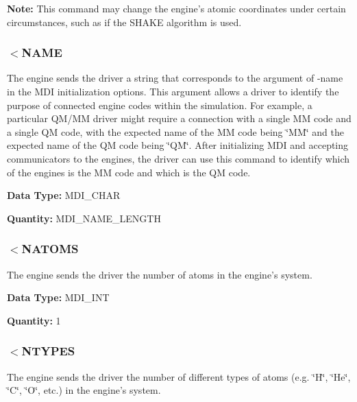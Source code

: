 \begin{DoxyParagraph}{}
{\bfseries  Note\-: } This command may change the engine's atomic coordinates under certain circumstances, such as if the S\-H\-A\-K\-E algorithm is used.
\end{DoxyParagraph}
\hypertarget{index_send_name}{}\subsubsection{$<$\-N\-A\-M\-E}\label{index_send_name}
The engine sends the driver a string that corresponds to the argument of {\ttfamily -\/name} in the M\-D\-I initialization options. This argument allows a driver to identify the purpose of connected engine codes within the simulation. For example, a particular Q\-M/\-M\-M driver might require a connection with a single M\-M code and a single Q\-M code, with the expected name of the M\-M code being \char`\"{}\-M\-M\char`\"{} and the expected name of the Q\-M code being \char`\"{}\-Q\-M\char`\"{}. After initializing M\-D\-I and accepting communicators to the engines, the driver can use this command to identify which of the engines is the M\-M code and which is the Q\-M code.

\begin{DoxyParagraph}{}
{\bfseries  Data Type\-: } M\-D\-I\-\_\-\-C\-H\-A\-R \par
 {\bfseries  Quantity\-: } {\ttfamily  M\-D\-I\-\_\-\-N\-A\-M\-E\-\_\-\-L\-E\-N\-G\-T\-H }
\end{DoxyParagraph}
\hypertarget{index_recv_natoms}{}\subsubsection{$<$\-N\-A\-T\-O\-M\-S}\label{index_recv_natoms}
The engine sends the driver the number of atoms in the engine's system.

\begin{DoxyParagraph}{}
{\bfseries  Data Type\-: } M\-D\-I\-\_\-\-I\-N\-T \par
 {\bfseries  Quantity\-: } 1
\end{DoxyParagraph}
\hypertarget{index_recv_types}{}\subsubsection{$<$\-N\-T\-Y\-P\-E\-S}\label{index_recv_types}
The engine sends the driver the number of different types of atoms (e.\-g. \char`\"{}\-H\char`\"{}, \char`\"{}\-He\char`\"{}, \char`\"{}\-C\char`\"{}, \char`\"{}\-O\char`\"{}, etc.) in the engine's system.

